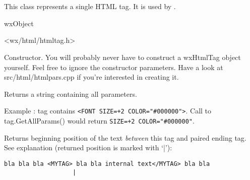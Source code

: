 %
%

\section{}\label{wxhtmltag}

This class represents a single HTML tag. 
It is used by .


wxObject


<wx/html/htmltag.h>




\label{wxhtmltagwxhtmltag}


Constructor. You will probably never have to construct a wxHtmlTag object
yourself. Feel free to ignore the constructor parameters.
Have a look at src/html/htmlpars.cpp if you're interested in creating it.

\label{wxhtmltaggetallparams}


Returns a string containing all parameters.

Example : tag contains {\tt <FONT SIZE=+2 COLOR="\#000000">}. Call to
tag.GetAllParams() would return {\tt SIZE=+2 COLOR="\#000000"}.


\label{wxhtmltaggetbeginpos}


Returns beginning position of the text {\it between} this tag and paired
ending tag. 
See explanation (returned position is marked with `|'):

\begin{verbatim}
bla bla bla <MYTAG> bla bla internal text</MYTAG> bla bla
                   |
\end{verbatim}


